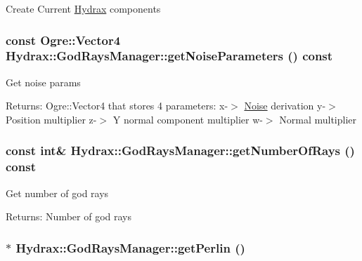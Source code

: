 \begin{CompactItemize}
Create  Current \hyperlink{class_hydrax_1_1_hydrax}{Hydrax} components \hypertarget{class_hydrax_1_1_god_rays_manager_cbbe97591ed2ce41ff2791c00588823d}{
\subsubsection[{getNoiseParameters}]{\setlength{\rightskip}{0pt plus 5cm}const Ogre::Vector4 Hydrax::GodRaysManager::getNoiseParameters () const}}
\label{class_hydrax_1_1_god_rays_manager_cbbe97591ed2ce41ff2791c00588823d}


Get noise params \begin{Desc}
\item[Returns:]Ogre::Vector4 that stores 4 parameters: x-$>$ \hyperlink{namespace_hydrax_1_1_noise}{Noise} derivation y-$>$ Position multiplier z-$>$ Y normal component multiplier w-$>$ Normal multiplier \end{Desc}
\hypertarget{class_hydrax_1_1_god_rays_manager_b3f75e765c4b537d0c8162591edae631}{
\subsubsection[{getNumberOfRays}]{\setlength{\rightskip}{0pt plus 5cm}const int\& Hydrax::GodRaysManager::getNumberOfRays () const}}
\label{class_hydrax_1_1_god_rays_manager_b3f75e765c4b537d0c8162591edae631}


Get number of god rays \begin{Desc}
\item[Returns:]Number of god rays \end{Desc}
\hypertarget{class_hydrax_1_1_god_rays_manager_90d9d1c53fc66eae89e4334580cd73bb}{
\subsubsection[{getPerlin}]{$\ast$ Hydrax::GodRaysManager::getPerlin ()}}
\label{class_hydrax_1_1_god_rays_manager_90d9d1c53fc66eae89e4334580cd73bb}



\end{CompactItemize}
